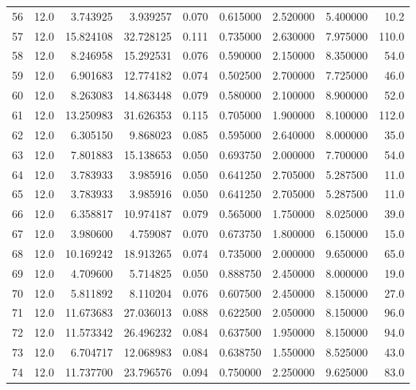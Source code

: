 \begin{tabular}{lrrrrrrrr}
56   &   12.0 &   3.743925 &   3.939257 &  0.070 &  0.615000 &  2.520000 &   5.400000 &   10.2 \\
57   &   12.0 &  15.824108 &  32.728125 &  0.111 &  0.735000 &  2.630000 &   7.975000 &  110.0 \\
58   &   12.0 &   8.246958 &  15.292531 &  0.076 &  0.590000 &  2.150000 &   8.350000 &   54.0 \\
59   &   12.0 &   6.901683 &  12.774182 &  0.074 &  0.502500 &  2.700000 &   7.725000 &   46.0 \\
60   &   12.0 &   8.263083 &  14.863448 &  0.079 &  0.580000 &  2.100000 &   8.900000 &   52.0 \\
61   &   12.0 &  13.250983 &  31.626353 &  0.115 &  0.705000 &  1.900000 &   8.100000 &  112.0 \\
62   &   12.0 &   6.305150 &   9.868023 &  0.085 &  0.595000 &  2.640000 &   8.000000 &   35.0 \\
63   &   12.0 &   7.801883 &  15.138653 &  0.050 &  0.693750 &  2.000000 &   7.700000 &   54.0 \\
64   &   12.0 &   3.783933 &   3.985916 &  0.050 &  0.641250 &  2.705000 &   5.287500 &   11.0 \\
65   &   12.0 &   3.783933 &   3.985916 &  0.050 &  0.641250 &  2.705000 &   5.287500 &   11.0 \\
66   &   12.0 &   6.358817 &  10.974187 &  0.079 &  0.565000 &  1.750000 &   8.025000 &   39.0 \\
67   &   12.0 &   3.980600 &   4.759087 &  0.070 &  0.673750 &  1.800000 &   6.150000 &   15.0 \\
68   &   12.0 &  10.169242 &  18.913265 &  0.074 &  0.735000 &  2.000000 &   9.650000 &   65.0 \\
69   &   12.0 &   4.709600 &   5.714825 &  0.050 &  0.888750 &  2.450000 &   8.000000 &   19.0 \\
70   &   12.0 &   5.811892 &   8.110204 &  0.076 &  0.607500 &  2.450000 &   8.150000 &   27.0 \\
71   &   12.0 &  11.673683 &  27.036013 &  0.088 &  0.622500 &  2.050000 &   8.150000 &   96.0 \\
72   &   12.0 &  11.573342 &  26.496232 &  0.084 &  0.637500 &  1.950000 &   8.150000 &   94.0 \\
73   &   12.0 &   6.704717 &  12.068983 &  0.084 &  0.638750 &  1.550000 &   8.525000 &   43.0 \\
74   &   12.0 &  11.737700 &  23.796576 &  0.094 &  0.750000 &  2.250000 &   9.625000 &   83.0 \\

\end{tabular}
